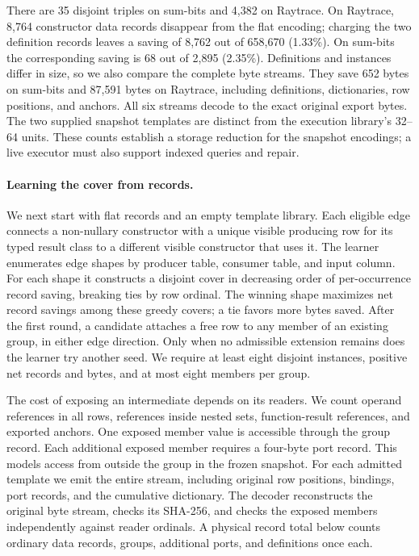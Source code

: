 \documentclass[10pt,letterpaper]{article}
\begin{document}
There are 35 disjoint triples on sum-bits and 4,382 on Raytrace. On Raytrace, 8,764 constructor data records disappear from the flat encoding; charging the two definition records leaves a saving of 8,762 out of 658,670 (1.33\%). On sum-bits the corresponding saving is 68 out of 2,895 (2.35\%). Definitions and instances differ in size, so we also compare the complete byte streams. They save 652 bytes on sum-bits and 87,591 bytes on Raytrace, including definitions, dictionaries, row positions, and anchors. All six streams decode to the exact original export bytes. The two supplied snapshot templates are distinct from the execution library's 32--64 units. These counts establish a storage reduction for the snapshot encodings; a live executor must also support indexed queries and repair.

\paragraph{Learning the cover from records.}
We next start with flat records and an empty template library. Each eligible edge connects a non-nullary constructor with a unique visible producing row for its typed result class to a different visible constructor that uses it. The learner enumerates edge shapes by producer table, consumer table, and input column. For each shape it constructs a disjoint cover in decreasing order of per-occurrence record saving, breaking ties by row ordinal. The winning shape maximizes net record savings among these greedy covers; a tie favors more bytes saved. After the first round, a candidate attaches a free row to any member of an existing group, in either edge direction. Only when no admissible extension remains does the learner try another seed. We require at least eight disjoint instances, positive net records and bytes, and at most eight members per group.

The cost of exposing an intermediate depends on its readers. We count operand references in all rows, references inside nested sets, function-result references, and exported anchors. One exposed member value is accessible through the group record. Each additional exposed member requires a four-byte port record. This models access from outside the group in the frozen snapshot. For each admitted template we emit the entire stream, including original row positions, bindings, port records, and the cumulative dictionary. The decoder reconstructs the original byte stream, checks its SHA-256, and checks the exposed members independently against reader ordinals. A physical record total below counts ordinary data records, groups, additional ports, and definitions once each.
\end{document}
